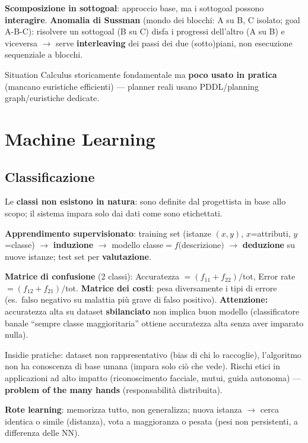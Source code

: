 \documentclass[10pt,a4paper]{article}
\newcommand{\attn}[1]{\textbf{Attenzione:} #1}
\begin{document}
\textbf{Scomposizione in sottogoal}: approccio base, ma i sottogoal possono \textbf{interagire}. \textbf{Anomalia di Sussman} (mondo dei blocchi: A su B, C isolato; goal A-B-C): risolvere un sottogoal (B su C) disfa i progressi dell'altro (A su B) e viceversa $\to$ serve \textbf{interleaving} dei passi dei due (sotto)piani, non esecuzione sequenziale a blocchi.

Situation Calculus storicamente fondamentale ma \textbf{poco usato in pratica} (mancano euristiche efficienti) --- planner reali usano PDDL/planning graph/euristiche dedicate.

\section{Machine Learning}

\subsection{Classificazione}

Le \textbf{classi non esistono in natura}: sono definite dal progettista in base allo scopo; il sistema impara solo dai dati come sono etichettati.

\textbf{Apprendimento supervisionato}: training set (istanze $(x,y)$, $x$=attributi, $y$=classe) $\to$ \textbf{induzione} $\to$ modello classe$=f($descrizione$)$ $\to$ \textbf{deduzione} su nuove istanze; test set per \textbf{valutazione}.

\textbf{Matrice di confusione} (2 classi): Accuratezza $=(f_{11}+f_{22})/\text{tot}$, Error rate $=(f_{12}+f_{21})/\text{tot}$. \textbf{Matrice dei costi}: pesa diversamente i tipi di errore (es.\ falso negativo su malattia più grave di falso positivo). \attn{accuratezza alta su dataset \textbf{sbilanciato} non implica buon modello (classificatore banale ``sempre classe maggioritaria'' ottiene accuratezza alta senza aver imparato nulla).}

Insidie pratiche: dataset non rappresentativo (bias di chi lo raccoglie), l'algoritmo non ha conoscenza di base umana (impara solo ciò che vede). Rischi etici in applicazioni ad alto impatto (riconoscimento facciale, mutui, guida autonoma) --- \textbf{problem of the many hands} (responsabilità distribuita).

\textbf{Rote learning}: memorizza tutto, non generalizza; nuova istanza $\to$ cerca identica o simile (distanza), vota a maggioranza o pesata (pesi non persistenti, a differenza delle NN).
\end{document}
